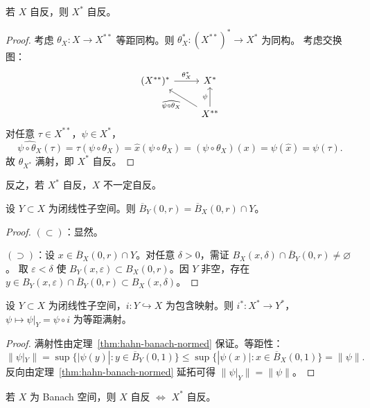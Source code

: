 \documentclass[lang=cn,a4paper,newtx,section]{elegantbook}
\begin{document}
\begin{proposition}
  若 $X$ 自反，则 $X^*$ 自反。
\end{proposition}

\begin{proof}
  考虑 $\theta_X:X\to X^{**}$ 等距同构。则 $\theta_X^*:(X^{**})^*\to X^*$ 为同构。
  考虑交换图：
  \[
    \begin{tikzcd}
      (X^{**})^* \arrow[r,"\theta_X^*"] & X^* \\
      & X^{**} \arrow[u,"\psi"] \arrow[ul,"\widehat{\psi\circ\theta_X}"]
    \end{tikzcd}
  \]
  对任意 $\tau\in X^{**}$，$\psi\in X^*$，
  \[
    \widehat{\psi\circ\theta_X}(\tau)=\tau(\psi\circ\theta_X)=\hat{x}(\psi\circ\theta_X)=(\psi\circ\theta_X)(x)=\psi(\hat{x})=\psi(\tau).
  \]
  故 $\theta_{X^*}$ 满射，即 $X^*$ 自反。
\end{proof}

\begin{remark}
  反之，若 $X^*$ 自反，$X$ 不一定自反。
\end{remark}

\begin{proposition}
  设 $Y\subset X$ 为闭线性子空间。则 $\overline{B}_Y(0,r)=\overline{B}_X(0,r)\cap Y$。
\end{proposition}

\begin{proof}
  $(\subset)$：显然。

  $(\supset)$：设 $x\in\overline{B}_X(0,r)\cap Y$。对任意 $\delta>0$，需证 $B_X(x,\delta)\cap\overline{B}_Y(0,r)\ne\varnothing$。
  取 $\varepsilon<\delta$ 使 $B_Y(x,\varepsilon)\subset B_X(0,r)$。因 $Y$ 非空，存在 $y\in B_Y(x,\varepsilon)\cap\overline{B}_Y(0,r)\subset B_X(x,\delta)$。
\end{proof}

\begin{proposition}
  设 $Y\subset X$ 为闭线性子空间，$i:Y\hookrightarrow X$ 为包含映射。则 $i^*:X^*\to Y^*$，$\psi\mapsto\psi|_Y=\psi\circ i$ 为等距满射。
\end{proposition}

\begin{proof}
  满射性由定理~\ref{thm:hahn-banach-normed} 保证。等距性：
  \[
    \|\psi|_Y\|=\sup\{|\psi(y)|:y\in\overline{B}_Y(0,1)\}\le\sup\{|\psi(x)|:x\in\overline{B}_X(0,1)\}=\|\psi\|.
  \]
  反向由定理~\ref{thm:hahn-banach-normed} 延拓可得 $\|\psi|_Y\|=\|\psi\|$。
\end{proof}

\begin{theorem}
  若 $X$ 为 Banach 空间，则 $X$ 自反 $\Longleftrightarrow$ $X^*$ 自反。
\end{theorem}
\end{document}
